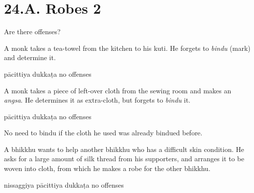 \chapter{24.A. Robes 2}
\renewcommand*{\theChapterTitle}{24.A. Robes 2}

\begin{exam}{\autoExamName}

  \begin{problem*}

    Are there offenses?

    \begin{parts}

      \item A monk takes a tea-towel from the kitchen to his kuti.
      He forgets to \emph{bindu} (mark) and determine it.

      \bigskip

      \begin{answers}{3}
        \bChoices
         pācittiya\eAns
         dukkaṭa\eAns
         no offenses\eAns
        \eChoices
      \end{answers}

      \bigskip

      \item A monk takes a piece of left-over cloth from the sewing room and
      makes an \emph{angsa}. He determines it as extra-cloth, but forgets to \emph{bindu} it.

      \bigskip

      \begin{answers}{3}
        \bChoices
         pācittiya\eAns
         dukkaṭa\eAns
         no offenses\eAns
        \eChoices
      \end{answers}

      \begin{solution}
        No need to bindu if the cloth he used was already bindued before.
      \end{solution}

      \bigskip

      \item A bhikkhu wants to help another bhikkhu who has a difficult skin
      condition. He asks for a large amount of silk thread from his supporters,
      and arranges it to be woven into cloth, from which he makes a robe for the
      other bhikkhu.

      \bigskip

      \begin{answers}{3}
        \bChoices
         nissaggiya pācittiya\eAns
         dukkaṭa\eAns
         no offenses\eAns
        \eChoices
      \end{answers}


\end{parts}
\end{problem*}
\end{exam}
